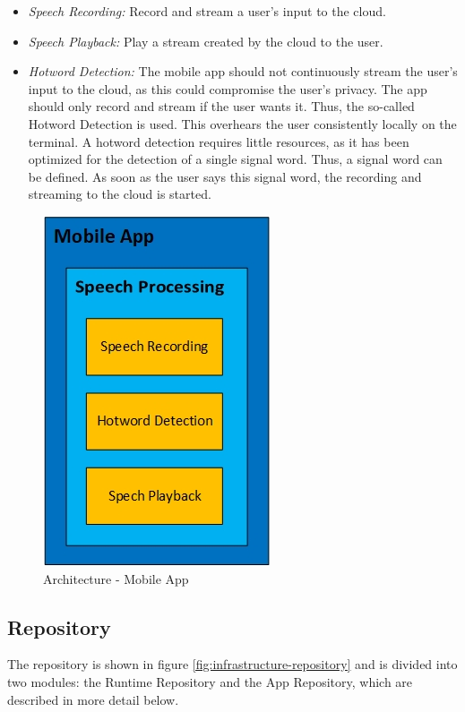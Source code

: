 \begin{itemize}
	\item \textsl{Speech Recording:} Record and stream a user's input to the cloud.
	\item \textsl{Speech Playback:} Play a stream created by the cloud to the user.
	\item \textsl{Hotword Detection:} The mobile app should not continuously stream the user's input to the cloud, as this could compromise the user's privacy. The app should only record and stream if the user wants it. Thus, the so-called \glqq Hotword Detection\grqq{} is used. This overhears the user consistently locally on the terminal. A hotword detection requires little resources, as it has been optimized for the detection of a single signal word. Thus, a signal word can be defined. As soon as the user says this signal word, the recording and streaming to the cloud is started.
\end{itemize}

\begin{figure}[h!]
	\centering
	\includegraphics[width=0.3\linewidth]{Picture/Infrastruktur-App.jpg}
	\caption[Architecture - Mobile App]{Architecture - Mobile App}
	\label{fig:infrastruktur-app}
\end{figure}

\subsection{Repository}
The repository is shown in figure \ref{fig:infrastructure-repository} and is divided into two modules: the Runtime Repository and the App Repository, which are described in more detail below.

